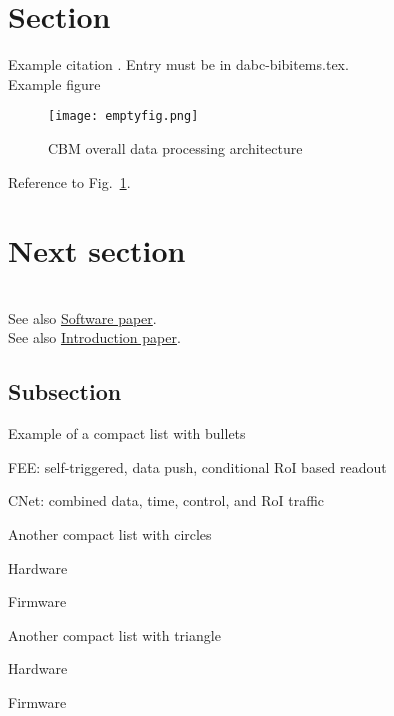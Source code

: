 \section{Section}

Example citation \cite{CBM-stat-rep}. Entry must be in
dabc-bibitems.tex.\\ %

Example figure
\begin{figure}[htb]
\centering\texttt{[image: emptyfig.png]} %
\caption{CBM overall data processing architecture}
\label{fig:XXX-fig} %
\end{figure}


Reference to Fig.~\ref{fig:XXX-fig}.
\clearpage %

\section{Next section}

\\
See also \hyperref{http://dabc.gsi.de/doc/manuals/main-software.pdf}{sw}{data}{Software paper}.\\
See also \hyperref{http://dabc.gsi.de/doc/manuals/main-intro.pdf}{in}{mission}{Introduction paper}.

\subsection{Subsection}

Example of a compact list with bullets
\bbul
\item FEE: self-triggered, data push, conditional RoI based readout
\item CNet: combined data, time, control, and RoI traffic
\ebul

Another compact list with circles
\bcir
\item Hardware
\item Firmware
\ecir

Another compact list with triangle
\btri
\item Hardware
\item Firmware
\etri

